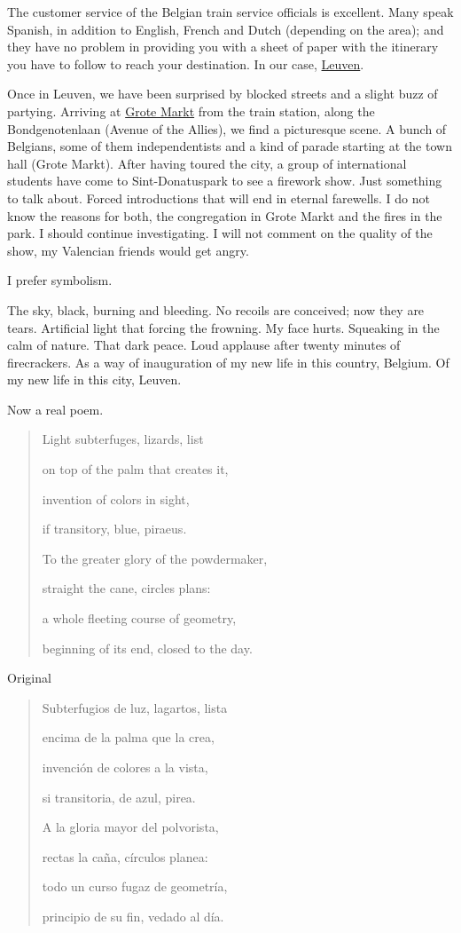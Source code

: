 \documentclass[]{book}
\begin{document}
The customer service of the Belgian train service officials is excellent. Many speak Spanish, in addition to English, French and Dutch (depending on the area); and they have no problem in providing you with a sheet of paper with the itinerary you have to follow to reach your destination. In our case, \href{https://en.wikipedia.org/wiki/Leuven}{Leuven}.

Once in Leuven, we have been surprised by blocked streets and a slight buzz of partying. Arriving at \href{https://en.wikipedia.org/wiki/Grote_Markt_(Leuven)}{Grote Markt} from the train station, along the Bondgenotenlaan (Avenue of the Allies), we find a picturesque scene. A bunch of Belgians, some of them independentists and a kind of parade starting at the town hall (Grote Markt). After having toured the city, a group of international students have come to Sint-Donatuspark to see a firework show. Just something to talk about. Forced introductions that will end in eternal farewells. I do not know the reasons for both, the congregation in Grote Markt and the fires in the park. I should continue investigating. I will not comment on the quality of the show, my Valencian friends would get angry.

I prefer symbolism.

The sky, black, burning and bleeding. No recoils are conceived; now they are tears. Artificial light that forcing the frowning. My face hurts. Squeaking in the calm of nature. That dark peace. Loud applause after twenty minutes of firecrackers. As a way of inauguration of my new life in this country, Belgium. Of my new life in this city, Leuven.

Now a real poem.

\begin{quote}
Light subterfuges, lizards, list

on top of the palm that creates it,

invention of colors in sight,

if transitory, blue, piraeus.

To the greater glory of the powdermaker,

straight the cane, circles plans:

a whole fleeting course of geometry,

beginning of its end, closed to the day.
\end{quote}

Original

\begin{quote}
Subterfugios de luz, lagartos, lista

encima de la palma que la crea,

invención de colores a la vista,

si transitoria, de azul, pirea.

A la gloria mayor del polvorista,

rectas la caña, círculos planea:

todo un curso fugaz de geometría,

principio de su fin, vedado al día.

\citet{hernandez1976perito}
\end{quote}
\end{document}
